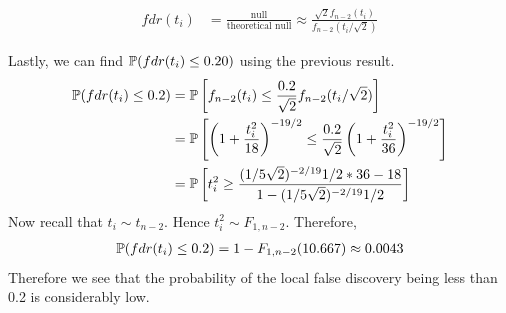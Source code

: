 \documentclass[11pt]{article}
\begin{document}
\begin{align*}
	fdr(t_i) &= \frac{\text{null}}{\text{theoretical null}} \approx \frac{\sqrt{2}f_{n-2}(t_i)}{f_{n-2}(t_i/\sqrt{2})}
\end{align*}

Lastly, we can find ${\mathbb{P}}(fdr(t_i)\leq 0.20)$ using the previous result. 
\begin{align*}
	{\mathbb{P}}(fdr(t_i)\leq 0.2) &= {\mathbb{P}}\left[f_{n-2}(t_i)\leq \frac{0.2}{\sqrt{2}}f_{n-2}(t_i/\sqrt{2})\right]\\
	&={\mathbb{P}}\left[\left(1 + \frac{t_i^2}{18}\right)^{-19/2} \leq \frac{0.2}{\sqrt{2}}\left(1+\frac{t_i^2}{36}\right)^{-19/2}\right]\\
	&= {\mathbb{P}}\left[t_i^2 \geq \frac{(1/5\sqrt{2})^{-2/19}1/2*36 - 18}{1 - (1/5\sqrt{2})^{-2/19}1/2}\right]
\end{align*}
Now recall that $t_i\sim t_{n-2}$. Hence $t_i^2 \sim F_{1,n-2}$. Therefore,
\begin{align*}
	{\mathbb{P}}(fdr(t_i)\leq 0.2) = 1 - F_{1,n-2}(10.667) \approx 0.0043
\end{align*}
Therefore we see that the probability of the local false discovery being less than 0.2 is considerably low. 
\end{document}
